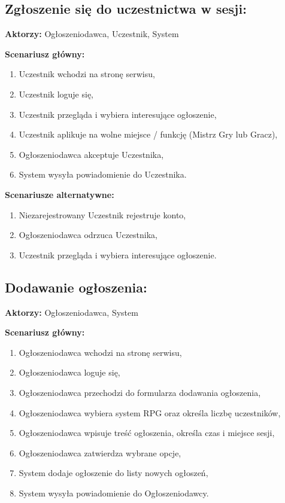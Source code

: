 
\subsection{Zgłoszenie się do uczestnictwa w sesji:}

\textbf{Aktorzy:} Ogłoszeniodawca, Uczestnik, System

\textbf{Scenariusz główny:}
	\begin{enumerate}
	\item Uczestnik wchodzi na stronę serwisu,
	\item Uczestnik loguje się,
	\item Uczestnik przegląda i wybiera interesujące ogłoszenie,
	\item Uczestnik aplikuje na wolne miejsce / funkcję (Mistrz Gry lub Gracz),
	\item Ogłoszeniodawca akceptuje Uczestnika,
	\item System wysyła powiadomienie do Uczestnika.
	\end{enumerate}

\textbf{Scenariusze alternatywne:}
	\begin{enumerate}
	\item Niezarejestrowany Uczestnik rejestruje konto,
	\item Ogłoszeniodawca odrzuca Uczestnika,
	\item Uczestnik przegląda i wybiera interesujące ogłoszenie.
	\end{enumerate}

\subsection{Dodawanie ogłoszenia:}

\textbf{Aktorzy:} Ogłoszeniodawca, System

\textbf{Scenariusz główny:}
	\begin{enumerate}
	\item Ogłoszeniodawca wchodzi na stronę serwisu,
	\item Ogłoszeniodawca loguje się,
	\item Ogłoszeniodawca przechodzi do formularza dodawania ogłoszenia,
	\item Ogłoszeniodawca wybiera system RPG oraz określa liczbę uczestników,
	\item Ogłoszeniodawca wpisuje treść ogłoszenia, określa czas i miejsce sesji,
	\item Ogłoszeniodawca zatwierdza wybrane opcje,
	\item System dodaje ogłoszenie do listy nowych ogłoszeń,
	\item System wysyła powiadomienie do Ogłoszeniodawcy.
	\end{enumerate}


